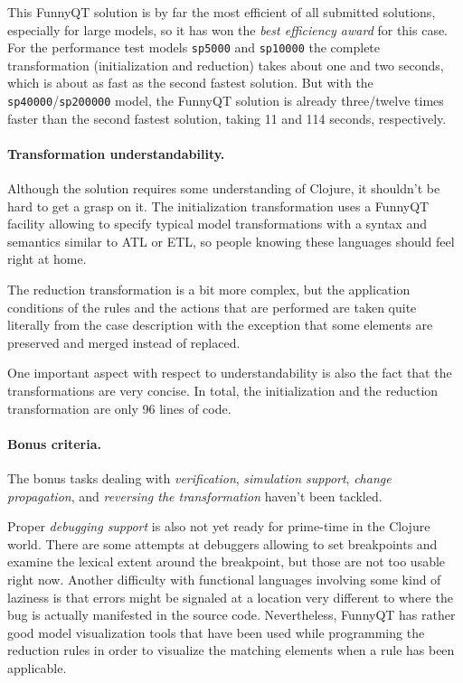 \documentclass[submission]{eptcs}
\begin{document}
This FunnyQT solution is by far the most efficient of all submitted solutions,
especially for large models, so it has won the \emph{best efficiency award} for
this case.  For the performance test models \verb|sp5000| and \verb|sp10000|
the complete transformation (initialization and reduction) takes about one and
two seconds, which is about as fast as the second fastest solution.  But with
the \verb|sp40000|/\verb|sp200000| model, the FunnyQT solution is already
three/twelve times faster than the second fastest solution, taking 11 and 114
seconds, respectively.

\paragraph{Transformation understandability.}

Although the solution requires some understanding of Clojure, it shouldn't be
hard to get a grasp on it.  The initialization transformation uses a FunnyQT
facility allowing to specify typical model transformations with a syntax and
semantics similar to ATL or ETL, so people knowing these languages should feel
right at home.

The reduction transformation is a bit more complex, but the application
conditions of the rules and the actions that are performed are taken quite
literally from the case description with the exception that some elements are
preserved and merged instead of replaced.

One important aspect with respect to understandability is also the fact that
the transformations are very concise.  In total, the initialization and the
reduction transformation are only 96 lines of code.

\paragraph{Bonus criteria.}

The bonus tasks dealing with \emph{verification}, \emph{simulation support},
\emph{change propagation}, and \emph{reversing the transformation} haven't been
tackled.

Proper \emph{debugging support} is also not yet ready for prime-time in the
Clojure world.  There are some attempts at debuggers allowing to set
breakpoints and examine the lexical extent around the breakpoint, but those are
not too usable right now.  Another difficulty with functional languages
involving some kind of laziness is that errors might be signaled at a location
very different to where the bug is actually manifested in the source code.
Nevertheless, FunnyQT has rather good model visualization tools that have been
used while programming the reduction rules in order to visualize the matching
elements when a rule has been applicable.
\end{document}
